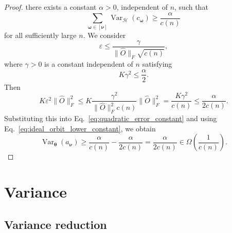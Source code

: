 \documentclass[%
 reprint,
 amsmath,amssymb,
 aps,
 pra,
]{revtex4-2}
\theoremstyle{definition}
\begin{document}
\begin{proof}
there exists a constant \(\alpha>0\), independent of \(n\), such that
\begin{equation}
\label{eq:ideal_orbit_lower_constant}
    \sum_{\bm{\omega}\in[\bm{\nu}]}
    \operatorname{Var}_{\mathcal H}(c_{\bm{\omega}})
    \ge
    \frac{\alpha}{c(n)}
\end{equation}
for all sufficiently large \(n\). We consider
\begin{equation}
\label{eq:explicit_epsilon_small_constant}
    \varepsilon
    \le
    \frac{\gamma}{\|\hat O\|_F\sqrt{c(n)}},
\end{equation}
where \(\gamma>0\) is a constant independent of \(n\) satisfying
\begin{equation}
\label{eq:gamma_small_enough}
    K\gamma^2
    \le
    \frac{\alpha}{2}.
\end{equation}
Then
\begin{equation}
    K\varepsilon^2\|\hat O\|_F^2
    \le
    K
    \frac{\gamma^2}{\|\hat O\|_F^2 c(n)}
    \|\hat O\|_F^2
    =
    \frac{K\gamma^2}{c(n)}
    \le
    \frac{\alpha}{2c(n)}.
\end{equation}
Substituting this into Eq.~\eqref{eq:quadratic_error_constant} and using
Eq.~\eqref{eq:ideal_orbit_lower_constant}, we obtain
\begin{equation}
\operatorname{Var}_{\bm{\theta}}(a_{\bm{\nu}})
\ge
\frac{\alpha}{c(n)}
-
\frac{\alpha}{2c(n)}
=
\frac{\alpha}{2c(n)}
\in
\Omega\!\left(\frac{1}{c(n)}\right).
\end{equation}
\end{proof}


\section{Variance}

\subsection{Variance reduction}
\label{sec:variance_reduction}
\end{document}
